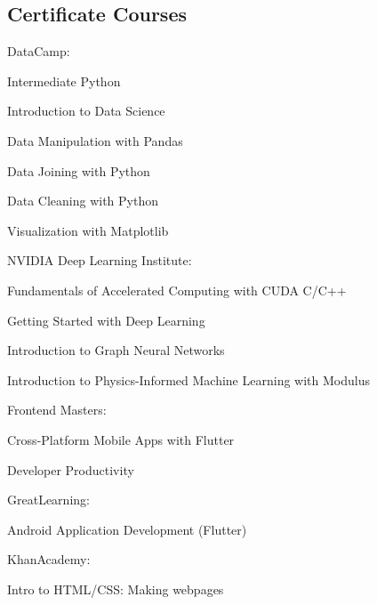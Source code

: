 \documentclass[]{m abbas resume' 2022}
\begin{document}
\begin{minipage}[t]{0.53\textwidth}
    \subsection{Certificate Courses}
    DataCamp:
    \begin{tightemize}
        \item Intermediate Python
        \item Introduction to Data Science
        \item Data Manipulation with Pandas
        \item Data Joining with Python
        \item Data Cleaning with Python
        \item Visualization with Matplotlib
    \end{tightemize}
    NVIDIA Deep Learning Institute:
    \begin{tightemize}
        \item Fundamentals of Accelerated Computing with CUDA C/C++
        \item Getting Started with Deep Learning
        \item Introduction to Graph Neural Networks
        \item Introduction to Physics-Informed Machine Learning with Modulus
    \end{tightemize}
    Frontend Masters:
    \begin{tightemize}
        \item Cross-Platform Mobile Apps with Flutter
        \item Developer Productivity
    \end{tightemize}
    GreatLearning:
    \begin{tightemize}
        \item Android Application Development (Flutter)
    \end{tightemize}
    KhanAcademy:
    \begin{tightemize}
        \item Intro to HTML/CSS: Making webpages
    \end{tightemize}
    \sectionsep
    

\end{minipage}
\end{document}

